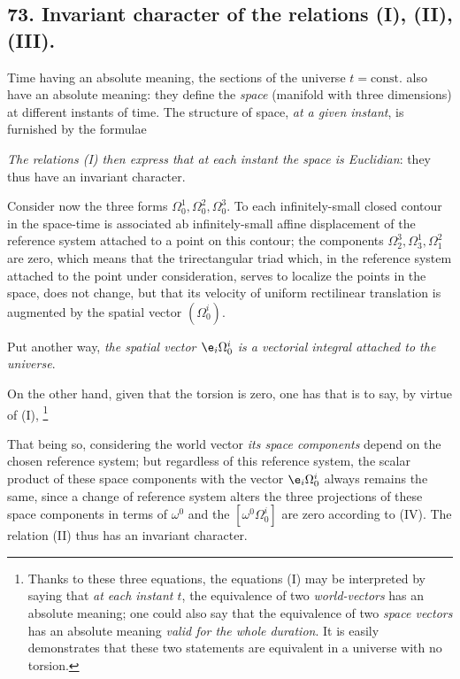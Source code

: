 \subsection*{73. Invariant character of the relations (I), (II), (III).}

Time having an absolute meaning, the sections of the universe $t=\text{const.}$ also have an absolute meaning: they define the \textit{space} (manifold with three dimensions) at different instants of time. The structure of space, \textit{at a given instant}, is furnished by the formulae

\textit{The relations (I) then express that at each instant the space is Euclidian}: they thus have an invariant character.

Consider now the three forms $\Omega_0^1, \Omega_0^2, \Omega_0^3$. To each infinitely-small closed contour in the space-time is associated ab infinitely-small affine displacement of the reference system attached to a point on this contour; the components $\Omega_2^3, \Omega_3^1, \Omega_1^2$ are zero, which means that the trirectangular triad which, in the reference system attached to the point under consideration, serves to localize the points in the space, does not change, but that its velocity of uniform rectilinear translation is augmented by the spatial vector $(\Omega_0^i)$.

Put another way, \textit{the spatial vector $\e_i \Omega_0^i$ is a vectorial integral attached to the universe}.

On the other hand, given that the torsion is zero, one has
that is to say, by virtue of (I),
\footnote{Thanks to these three equations, the equations (I) may be interpreted by saying that \textit{at each instant $t$}, the equivalence of two \textit{world-vectors} has an absolute meaning; one could also say that the equivalence of two \textit{space vectors} has an absolute meaning \textit{valid for the whole duration}. It is easily demonstrates that these two statements are equivalent in a universe with no torsion.}

That being so, considering the world vector
\textit{its space components} depend on the chosen reference system; but regardless of this reference system, the scalar product
of these space components with the vector $\e_i \Omega_0^i$ always remains the same, since a change of reference system alters the three projections of these space components in terms of $\omega^0$ and the $[\omega^0 \Omega_0^i]$ are zero according to (IV). The relation (II) thus has an invariant character.

